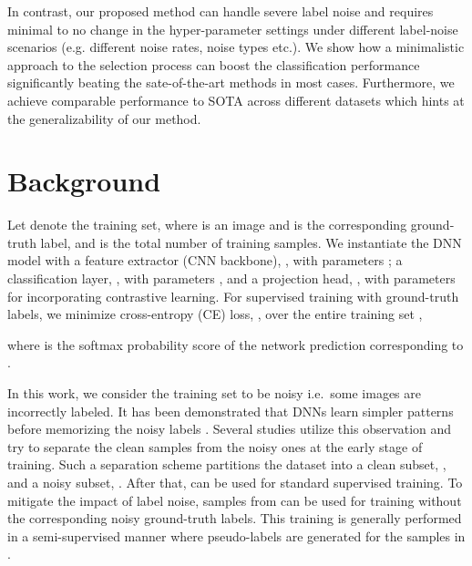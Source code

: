 \documentclass[10pt,twocolumn,letterpaper]{article}
\begin{document}
In contrast, our proposed method can handle severe label noise and requires minimal to no change in the hyper-parameter settings under different label-noise scenarios (e.g. different noise rates, noise types etc.). We show how a minimalistic approach to the selection process can boost the classification performance significantly beating the sate-of-the-art methods in most cases. Furthermore, we achieve comparable performance to SOTA across different datasets which hints at the generalizability of our method. 

\section{Background} \label{sec:Method}
Let  denote the training set, where 
is an image and  is the corresponding ground-truth label,  
and  is the total number of training samples. We instantiate the DNN model with a feature extractor (CNN backbone), , with parameters ; a classification layer, , with parameters , and a projection head, , with parameters  for incorporating contrastive learning.
For supervised training with ground-truth labels, we minimize cross-entropy (CE) loss, , over the entire training set ,


\noindent where  is the softmax probability score of the network prediction corresponding to .


In this work, we consider the training set to be noisy i.e.~some images are incorrectly labeled. 
It has been demonstrated that DNNs learn simpler patterns before memorizing the noisy labels \cite{arpit2017closer}. Several studies \cite{li2020dividemix, han2018co} utilize this observation and try to separate the clean samples from the noisy ones at the early stage of training. Such a separation scheme partitions the dataset into a clean subset, , and a noisy subset, .
After that,  can be used for standard supervised training. To mitigate the impact of label noise, samples from  can be used for training without the corresponding noisy ground-truth labels. This training is generally performed in a semi-supervised manner where pseudo-labels are generated for the samples in .
\end{document}
